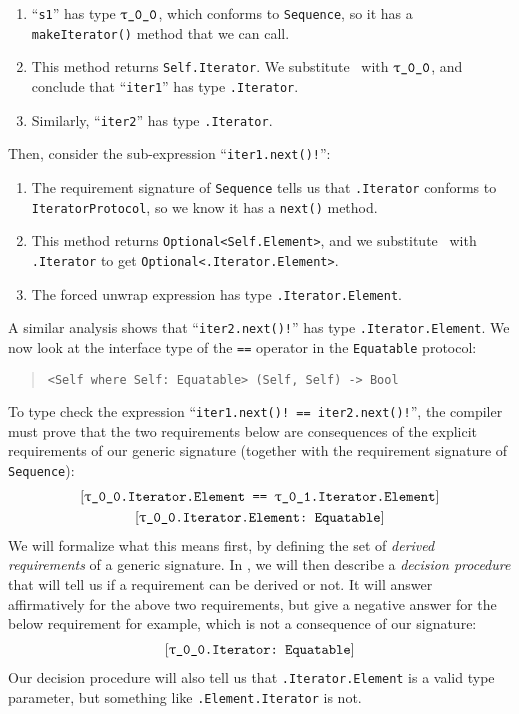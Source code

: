 \documentclass[../generics]{subfiles}
\begin{document}
\begin{example}
\begin{enumerate}
\item ``\texttt{s1}'' has type $\rT$, which conforms to \texttt{Sequence}, so it has a \texttt{makeIterator()} method that we can call.
\item This method returns \texttt{Self.Iterator}. We substitute \tSelf\ with $\rT$, and conclude that ``\texttt{iter1}'' has type \texttt{\rT.Iterator}.
\item Similarly, ``\texttt{iter2}'' has type \texttt{\rU.Iterator}.
\end{enumerate}
Then, consider the sub-expression ``\verb|iter1.next()!|'':
\begin{enumerate}
\item The requirement signature of \texttt{Sequence} tells us that \texttt{\rT.Iterator} conforms to \texttt{IteratorProtocol}, so we know it has a \texttt{next()} method.
\item This method returns \texttt{Optional<Self.Element>}, and we substitute \tSelf\ with \texttt{\rT.Iterator} to get \texttt{Optional<\rT.Iterator.Element>}.
\item The forced unwrap expression has type \texttt{\rT.Iterator.Element}. 
\end{enumerate}
A similar analysis shows that ``\verb|iter2.next()!|'' has type \texttt{\rU.Iterator.Element}. We now look at the interface type of the \texttt{==} operator in the \texttt{Equatable} protocol:
\begin{quote}
\begin{verbatim}
<Self where Self: Equatable> (Self, Self) -> Bool
\end{verbatim}
\end{quote}
To type check the expression ``\verb|iter1.next()! == iter2.next()!|'', the compiler must prove that the two requirements below are consequences of the explicit requirements of our generic signature (together with the requirement signature of \texttt{Sequence}):
\begin{gather*}
\SameReq{\rT.Iterator.Element}{\rU.Iterator.Element}\\
\ConfReq{\rT.Iterator.Element}{Equatable}
\end{gather*}
We will formalize what this means first, by defining the set of \emph{derived requirements} of a generic signature. In , we will then describe a \emph{decision procedure} that will tell us if a requirement can be derived or not. It will answer affirmatively for the above two requirements, but give a negative answer for the below requirement for example, which is not a consequence of our signature:
\begin{gather*}
\ConfReq{\rT.Iterator}{Equatable}
\end{gather*}
Our decision procedure will also tell us that \texttt{\rT.Iterator.Element} is a valid type parameter, but something like \texttt{\rT.Element.Iterator} is not.
\end{example}
\end{document}
